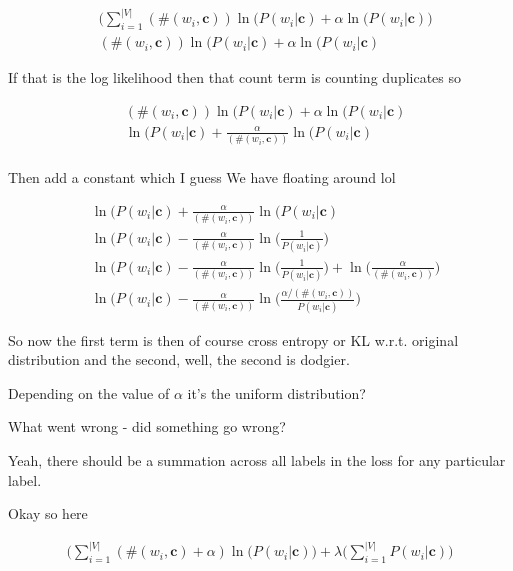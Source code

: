 \documentclass{article}
\newcommand{\context}{\boldsymbol{c}}
\begin{document}
		\begin{align}
			& \bigg( \sum^{|V|}_{i=1} (\#(w_i, \context) )\ln(P(w_i|\context) + \alpha\ln(P(w_i|\context)\bigg) \\
			& (\#(w_i, \context) )\ln(P(w_i|\context) + \alpha\ln(P(w_i|\context)
		\end{align}
		
	 	If that is the log likelihood then that count term is counting duplicates so
		
		\begin{align}
			& (\#(w_i, \context) )\ln(P(w_i|\context) + \alpha\ln(P(w_i|\context)\\
			& \ln(P(w_i|\context) + \frac{\alpha}{(\#(w_i, \context) )}\ln(P(w_i|\context)\\
		\end{align}
			
		Then add a constant which I guess We have floating around lol
			
		\begin{align}
			& \ln(P(w_i|\context) + \frac{\alpha}{(\#(w_i, \context) )}\ln(P(w_i|\context)\\
			& \ln(P(w_i|\context) - \frac{\alpha}{(\#(w_i, \context) )}\ln\bigg(\frac{1}{P(w_i|\context)}\bigg)\\
			& \ln(P(w_i|\context) - \frac{\alpha}{(\#(w_i, \context) )}\ln\bigg(\frac{1}{P(w_i|\context)}\bigg) + \ln\bigg( \frac{\alpha}{(\#(w_i, \context) )} \bigg)\\
			& \ln(P(w_i|\context) - \frac{\alpha}{(\#(w_i, \context) )}\ln\bigg(\frac{\alpha/(\#(w_i, \context) )}{P(w_i|\context)}\bigg) 
		\end{align}	
			
		So now the first term is then of course cross entropy or KL w.r.t. original distribution and the second, well, the second is dodgier.
		
		Depending on the value of $\alpha$ it's the uniform distribution? 	 
			
		What went wrong - did something go wrong? 
		
		Yeah, there should be a summation across all labels in the loss for any particular label. 
		
		Okay so here 
			
		\begin{align}
			\bigg( \sum^{|V|}_{i=1} (\#(w_i, \context) + \alpha)\ln(P(w_i|\context)\bigg) + \lambda\bigg(\sum^{|V|}_{i=1} P(w_i|\context) \bigg)
		\end{align}
			
\end{document}
